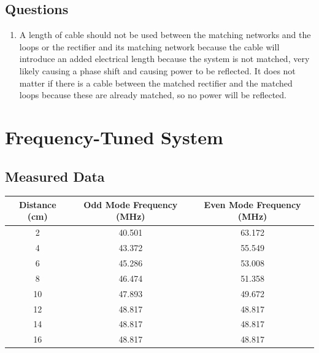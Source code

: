 \documentclass{article}
\begin{document}
\subsection{Questions}

\begin{enumerate}
	\item A length of cable should not be used between the matching networks and the loops or the rectifier and its matching network because the cable will introduce an added electrical length because the system is not matched, very likely causing a phase shift and causing power to be reflected. It does not matter if there is a cable between the matched rectifier and the matched loops because these are already matched, so no power will be reflected.

\end{enumerate}


\section{Frequency-Tuned System}

\subsection{Measured Data}
\begin{table}[H]
\centering
\begin{tabular}{|c|c|c|}
\hline
Distance (cm) & Odd Mode Frequency (MHz) & Even Mode Frequency (MHz) \\ \hline
2             & 40.501                   & 63.172                    \\ \hline
4             & 43.372                   & 55.549                    \\ \hline
6             & 45.286                   & 53.008                    \\ \hline
8             & 46.474                   & 51.358                    \\ \hline
10            & 47.893                   & 49.672                    \\ \hline
12            & 48.817                   & 48.817                    \\ \hline
14            & 48.817                   & 48.817                    \\ \hline
16            & 48.817                   & 48.817                    \\ \hline
\end{tabular}
\end{table}
\end{document}
